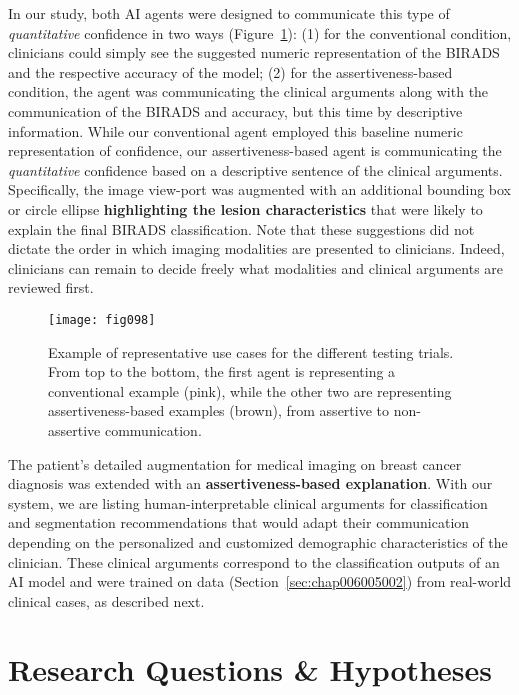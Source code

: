 In our study, both AI agents were designed to communicate this type of {\it quantitative} confidence in two ways (Figure~\ref{fig:fig098}):
(1) for the conventional condition, clinicians could simply see the suggested numeric representation of the BIRADS and the respective accuracy of the model;
(2) for the assertiveness-based condition, the agent was communicating the clinical arguments along with the communication of the BIRADS and accuracy, but this time by descriptive information.
While our conventional agent employed this baseline numeric representation of confidence, our assertiveness-based agent is communicating the {\it quantitative} confidence based on a descriptive sentence of the clinical arguments.
Specifically, the image view-port was augmented with an additional bounding box or circle ellipse {\bf highlighting the lesion characteristics} that were likely to explain the final BIRADS classification.
Note that these suggestions did not dictate the order in which imaging modalities are presented to clinicians.
Indeed, clinicians can remain to decide freely what modalities and clinical arguments are reviewed first.

\begin{figure}[htpb]
\begin{center}
\centering
\texttt{[image: fig098]}
\end{center}
\caption[]{Example of representative use cases for the different testing trials. From top to the bottom, the first agent is representing a conventional example (pink), while the other two are representing assertiveness-based examples (brown), from assertive to non-assertive communication.}
\label{fig:fig098}
\end{figure}

The patient's detailed augmentation for medical imaging on breast cancer diagnosis was extended with an {\bf assertiveness-based explanation}.
With our system, we are listing human-interpretable clinical arguments for classification and segmentation recommendations that would adapt their communication depending on the personalized and customized demographic characteristics of the clinician.
These clinical arguments correspond to the classification outputs of an AI model and were trained on data (Section~\ref{sec:chap006005002}) from real-world clinical cases, as described next.

\section{Research Questions \& Hypotheses}
\label{sec:chap006004}

